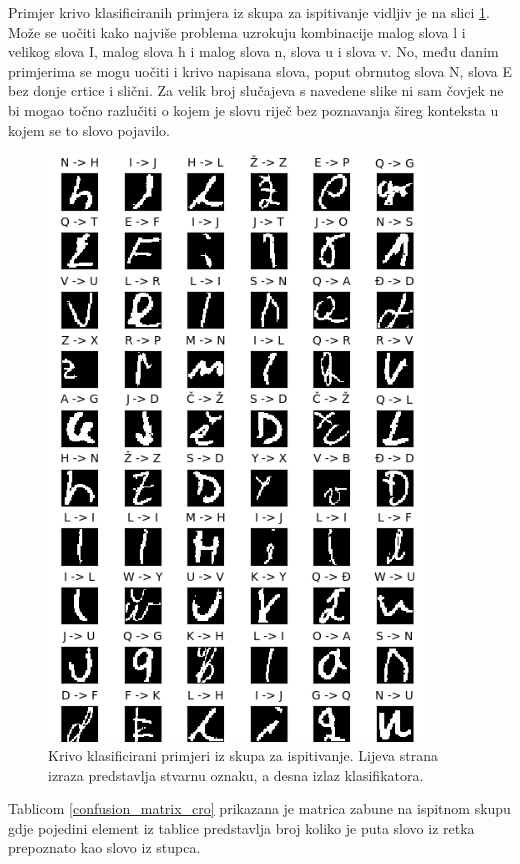 Primjer krivo klasificiranih primjera iz skupa za ispitivanje vidljiv je na slici \ref{fig:wrong_class}. Može se uočiti kako najviše problema uzrokuju kombinacije malog slova l i velikog slova I, malog slova h i malog slova n, slova u i slova v. No, među danim primjerima se mogu uočiti i krivo napisana slova, poput obrnutog slova N, slova E bez donje crtice i slični. Za velik broj slučajeva s navedene slike ni sam čovjek ne bi mogao točno razlučiti o kojem je slovu riječ bez poznavanja šireg konteksta u kojem se to slovo pojavilo.

\begin{figure}[htb]
    \centering
    \includegraphics[width=10cm]{images/wrong.png}
    \caption{Krivo klasificirani primjeri iz skupa za ispitivanje. Lijeva strana izraza predstavlja stvarnu oznaku, a desna izlaz klasifikatora.}
    \label{fig:wrong_class}
\end{figure}

Tablicom \ref{confusion_matrix_cro} prikazana je matrica zabune na ispitnom skupu gdje pojedini element iz tablice predstavlja broj koliko je puta slovo iz retka prepoznato kao slovo iz stupca.
 
